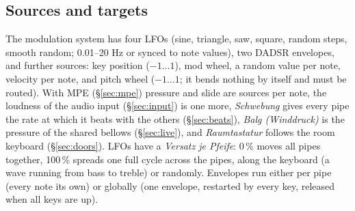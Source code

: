 \documentclass[11pt,a4paper,parskip=half,DIV=11,toc=bibliography]{scrartcl}
\newcommand{\ui}[1]{\emph{#1}}                 %
\begin{document}
\subsection{Sources and targets}
The modulation system has four LFOs (sine, triangle, saw, square, random steps, smooth random; 0.01--20
Hz or synced to note values), two DADSR envelopes, and further sources: key position
($-1\dots1$), mod wheel, a random value per note, velocity per note, and pitch wheel ($-1\dots1$; it bends
nothing by itself and must be routed). With MPE (\S\ref{sec:mpe}) pressure and slide are sources per note, the loudness of the audio input (\S\ref{sec:input}) is one more, \ui{Schwebung} gives every pipe the rate at which it beats with the others (\S\ref{sec:beats}), \ui{Balg (Winddruck)} is the pressure of the shared bellows (\S\ref{sec:live}), and \ui{Raumtastatur} follows the room keyboard (\S\ref{sec:doors}). LFOs have a \ui{Versatz je Pfeife}: 0\,\% moves all pipes
together, 100\,\% spreads one full cycle across the pipes, along the keyboard (a wave running from bass
to treble) or randomly. Envelopes run either per pipe (every note its own) or globally (one envelope,
restarted by every key, released when all keys are up).
\end{document}

